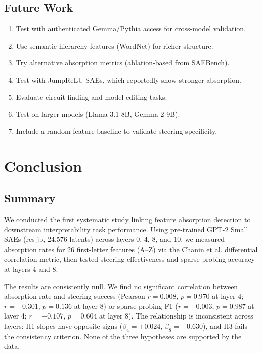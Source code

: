 \documentclass{article}
\begin{document}
\subsection{Future Work}

\begin{enumerate}
    \item Test with authenticated Gemma/Pythia access for cross-model validation.
    \item Use semantic hierarchy features (WordNet) for richer structure.
    \item Try alternative absorption metrics (ablation-based from SAEBench).
    \item Test with JumpReLU SAEs, which reportedly show stronger absorption.
    \item Evaluate circuit finding and model editing tasks.
    \item Test on larger models (Llama-3.1-8B, Gemma-2-9B).
    \item Include a random feature baseline to validate steering specificity.
\end{enumerate}

\section{Conclusion}
\label{sec:conclusion}

\subsection{Summary}

We conducted the first systematic study linking feature absorption detection to downstream interpretability task performance. Using pre-trained GPT-2 Small SAEs (res-jb, 24,576 latents) across layers 0, 4, 8, and 10, we measured absorption rates for 26 first-letter features (A--Z) via the Chanin et al. differential correlation metric, then tested steering effectiveness and sparse probing accuracy at layers 4 and 8.

The results are consistently null. We find no significant correlation between absorption rate and steering success (Pearson $r = 0.008$, $p = 0.970$ at layer 4; $r = -0.301$, $p = 0.136$ at layer 8) or sparse probing F1 ($r = -0.003$, $p = 0.987$ at layer 4; $r = -0.107$, $p = 0.604$ at layer 8). The relationship is inconsistent across layers: H1 slopes have opposite signs ($\beta_4 = +0.024$, $\beta_8 = -0.630$), and H3 fails the consistency criterion. None of the three hypotheses are supported by the data.
\end{document}
